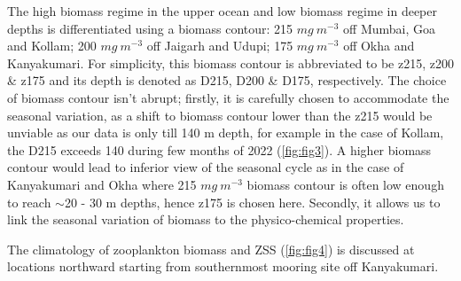\documentclass{article}
\begin{document}
	

	The high biomass regime in the upper ocean and low biomass regime in deeper depths is differentiated using a biomass contour: 215 $mg \ m^{-3}$ off Mumbai, Goa and Kollam; 200 $mg \ m^{-3}$ off Jaigarh and Udupi; 175 $mg \ m^{-3}$ off Okha and Kanyakumari. For simplicity, this biomass contour is abbreviated to be z215, z200 \& z175 and its depth is denoted as D215, D200 \& D175, respectively. The choice of biomass contour isn't abrupt; firstly, it is carefully chosen to accommodate the seasonal variation, as a shift to biomass contour lower than the z215 would be unviable as our data is only till 140 m depth, for example in the case of Kollam, the D215 exceeds 140 during few months of 2022 (\cref{fig:fig3}). A higher biomass contour would lead to inferior view of the seasonal cycle as in the case of Kanyakumari and Okha where 215 $mg \ m^{-3}$ biomass contour is often low enough to reach $\sim$20 - 30 m depths, hence z175 is chosen here. Secondly, it allows us to link the seasonal variation of biomass to the physico-chemical properties.
	
	The climatology of zooplankton biomass and ZSS (\cref{fig:fig4}) is discussed at locations northward starting from southernmost mooring site off Kanyakumari. 
	
\end{document}
